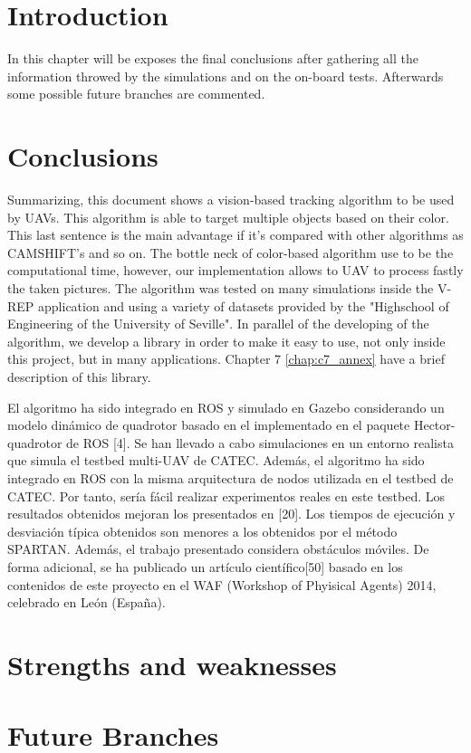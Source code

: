 \section{Introduction}
	In this chapter will be exposes the final conclusions after gathering all the information throwed by the simulations and on the on-board tests. Afterwards some possible future branches are commented.
	
\section{Conclusions}
	Summarizing, this document shows a vision-based tracking algorithm to be used by UAVs. This algorithm is able to target multiple objects based on their color. This last sentence is the main advantage if it's compared with other algorithms as CAMSHIFT's and so on. The bottle neck of color-based algorithm use to be the computational time, however, our implementation allows to UAV to process fastly the taken pictures.
	The algorithm was tested on many simulations inside the V-REP application and using a variety of datasets provided by the "Highschool of Engineering of the University of Seville".
	In parallel of the developing of the algorithm, we develop a library in order to make it easy to use, not only inside this project, but in many applications. Chapter 7 \ref{chap:c7_annex} have a brief description of this library.
	

El algoritmo ha sido integrado en ROS y simulado en Gazebo considerando un modelo dinámico de
quadrotor basado en el implementado en el paquete Hector-quadrotor de ROS [4]. Se han llevado a cabo
simulaciones en un entorno realista que simula el testbed multi-UAV de CATEC. Además, el algoritmo ha
sido integrado en ROS con la misma arquitectura de nodos utilizada en el testbed de CATEC. Por tanto, sería
fácil realizar experimentos reales en este testbed.
Los resultados obtenidos mejoran los presentados en [20]. Los tiempos de ejecución y desviación típica
obtenidos son menores a los obtenidos por el método SPARTAN. Además, el trabajo presentado considera
obstáculos móviles.
De forma adicional, se ha publicado un artículo científico[50] basado en los contenidos de este proyecto
en el WAF (Workshop of Phyisical Agents) 2014, celebrado en León (España).
	
\section{Strengths and weaknesses}

\section{Future Branches}
